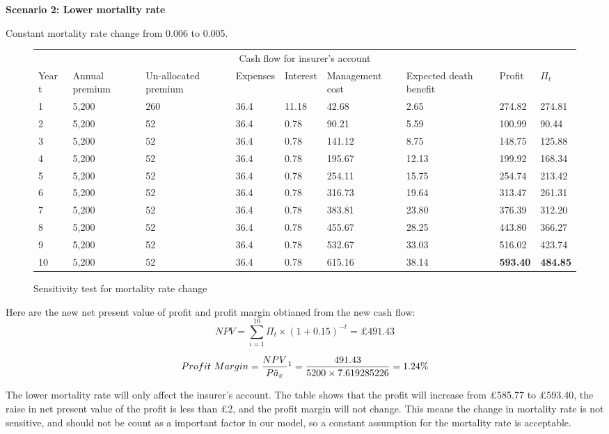 \documentclass{report}
\begin{document}
\textbf{Scenario 2: Lower mortality rate} 

Constant mortality rate change from 0.006 to 0.005.



\begin{figure}[H]
\hfill
\begin{tabular}{p{0.8cm} p{1.5cm} p{1.5cm} p{1.2cm} p{1cm} p{2cm}p{1.5cm} p{1.5cm} p{1.5cm} }
\toprule
\multicolumn{9}{c}{Cash flow for insurer's account} \\
\cmidrule(r){3-7}

Year t & Annual premium & Un-allocated premium & Expenses & Interest &Management cost& Expected death benefit & Profit& $\Pi_t$  \\
\midrule

1&5,200&260&36.4&11.18&42.68&2.65&274.82&274.81\\
2&5,200&52&36.4&0.78&90.21&5.59&100.99&90.44\\
3&5,200&52&36.4&0.78&141.12&8.75&148.75&125.88\\
4&5,200&52&36.4&0.78&195.67&12.13&199.92&168.34\\
5&5,200&52&36.4&0.78&254.11&15.75&254.74&213.42\\
6&5,200&52&36.4&0.78&316.73&19.64&313.47&261.31\\
7&5,200&52&36.4&0.78&383.81&23.80&376.39&312.20\\
8&5,200&52&36.4&0.78&455.67&28.25&443.80&366.27\\
9&5,200&52&36.4&0.78&532.67&33.03&516.02&423.74\\
10&5,200&52&36.4&0.78&615.16&38.14&\textbf{593.40}&\textbf{484.85}\\

\bottomrule
\end{tabular}
\caption{Sensitivity test for mortality rate change}
\label{determ-sensi-morta}
\end{figure}

Here are the new net present value of profit and profit margin obtianed from the new cash flow:
\[
 NPV=\sum_{i=1}^{10} \Pi_t \times (1+0.15)^{-t} = \pounds 491.43
\]
 


\[
Profit\ Margin =  \frac{NPV}{P \ddot{a}_x}\footnote{$\ddot{a}_x$=$\sum_{i=1}^{10} v^t {_tp_x}$=7.619285226, where $_tp_x$ read from table ?!?!?!? and $v=\frac{1}{1+0.05}$}  = \frac{491.43}{5200 \times 7.619285226} = 1.24\%
\]

The lower mortality rate will only affect the insurer's account. The table shows that the profit will increase from \pounds585.77 to \pounds 593.40, the raise in net present value of the profit is less than \pounds2, and the profit margin will not change. This means the change in mortality rate is not sensitive, and should not be count as a important factor in our model, so a constant assumption for the mortality rate is acceptable.
\end{document}
